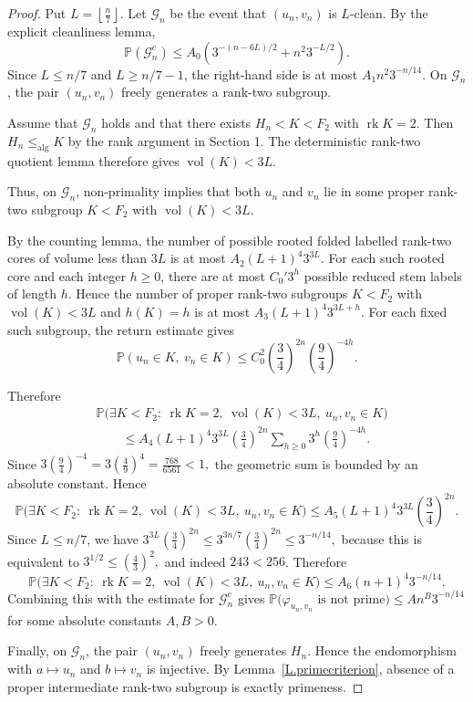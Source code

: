 \documentclass{amsproc}
\newcommand{\rk}{\operatorname{rk}}
\newcommand{\vol}{\operatorname{vol}}
\newcommand{\alg}{\operatorname{alg}}
\newcommand{\Prob}{\mathbb P}
\begin{document}
\begin{proof}
Put
$
        L=\left\lfloor\frac n7\right\rfloor.
$
Let $\mathcal G_n$ be the event that $(u_n,v_n)$ is $L$-clean.  By the
explicit cleanliness lemma,
\[
        \Prob(\mathcal G_n^c)
        \leq A_0\left(3^{-(n-6L)/2}+n^2 3^{-L/2}\right).
\]
Since $L\leq n/7$ and $L\geq n/7-1$, the right-hand side is at most
$
        A_1 n^2 3^{-n/14}.
$
On $\mathcal G_n$, the pair $(u_n,v_n)$ freely generates a rank-two subgroup.

Assume that $\mathcal G_n$ holds and that there exists
\(H_n<K<F_2\) with $\rk K=2$.  Then $H_n\leq_{\alg}K$
by the rank argument in Section 1.  The deterministic rank-two quotient lemma
therefore gives $\vol(K)<3L$.

Thus, on $\mathcal G_n$, non-primality implies that both $u_n$ and $v_n$ lie in
some proper rank-two subgroup $K<F_2$ with $\vol(K)<3L$.

By the counting lemma, the number of possible rooted folded labelled rank-two
cores of volume less than $3L$ is at most
$
        A_2 (L+1)^4 3^{3L}.
$
For each such rooted core and each integer $h\geq 0$, there are at most
$C_0'3^h$ possible reduced stem labels of length $h$.  Hence the number of
proper rank-two subgroups $K<F_2$ with $\vol(K)<3L$ and
$h(K)=h$ is at most
$
        A_3 (L+1)^4 3^{3L+h}.
$
For each fixed such subgroup, the return estimate gives
\[
        \Prob(u_n\in K,\ v_n\in K)
        \leq C_0^2 \left(\frac34\right)^{2n}\left(\frac94\right)^{-4h}.
\]

Therefore
\[
\begin{aligned}
&\Prob\bigl(\exists K<F_2:\ \rk K=2,\ \vol(K)<3L,
                  \ u_n,v_n\in K\bigr) \\
&\qquad\leq
        A_4 (L+1)^4 3^{3L} \left(\frac34\right)^{2n}
        \sum_{h\geq 0} 3^h\left(\frac94\right)^{-4h}.
\end{aligned}
\]
Since
$
        3\left(\frac94\right)^{-4}=3\left(\frac49\right)^4=\frac{768}{6561}<1,
$
the geometric sum is bounded by an absolute constant.  Hence
\[
        \Prob\bigl(\exists K<F_2:\ \rk K=2,\ \vol(K)<3L,
                  \ u_n,v_n\in K\bigr)
        \leq A_5 (L+1)^4 3^{3L}\left(\frac34\right)^{2n}.
\]
Since $L\leq n/7$, we have
$
        3^{3L}\left(\frac34\right)^{2n}
        \leq 3^{3n/7}\left(\frac34\right)^{2n}
        \leq 3^{-n/14},
$
because this is equivalent to
$
        3^{1/2}\leq \left(\frac43\right)^2,
$
and indeed $243<256$.  Therefore
\[
        \Prob\bigl(\exists K<F_2:\ \rk K=2,\ \vol(K)<3L,
                  \ u_n,v_n\in K\bigr)
        \leq A_6 (n+1)^4 3^{-n/14}.
\]
Combining this with the estimate for $\mathcal G_n^c$ gives
$
        \Prob\bigl(\varphi_{u_n,v_n}\text{ is not prime}\bigr)
        \leq A n^B 3^{-n/14}
$
for some absolute constants $A,B>0$.

Finally, on $\mathcal G_n$, the pair $(u_n,v_n)$ freely generates $H_n$.
Hence the endomorphism with $a\mapsto u_n$ and $b\mapsto v_n$ is injective.  By
Lemma~\ref{L.primecriterion}, absence of a proper intermediate rank-two
subgroup is exactly primeness.
\end{proof}
\end{document}
